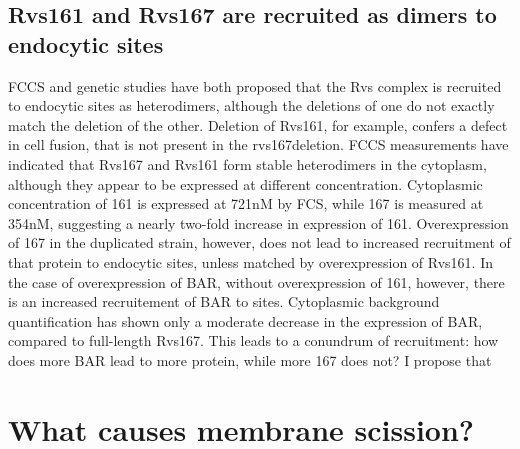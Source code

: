 \subsection{Rvs161 and Rvs167 are recruited as dimers to endocytic sites}
FCCS and genetic studies have both proposed that the Rvs complex is recruited to endocytic sites as heterodimers, although the deletions of one do not exactly match the deletion of the other. Deletion of Rvs161, for example, confers a defect in cell fusion, that is not present in the rvs167deletion. FCCS measurements have indicated that Rvs167 and Rvs161 form stable heterodimers in the cytoplasm, although they appear to be expressed at different concentration. Cytoplasmic concentration of 161 is expressed at 721nM by FCS, while 167 is measured at 354nM, suggesting a nearly two-fold increase in expression of 161. Overexpression of 167 in the duplicated strain, however, does not lead to increased recruitment of that protein to endocytic sites, unless matched by overexpression of Rvs161. In the case of overexpression of BAR, without overexpression of 161, however, there is an increased recruitement of BAR to sites. Cytoplasmic background quantification has shown only a moderate decrease in the expression of BAR, compared to full-length Rvs167. This leads to a conundrum of recruitment: how does more BAR lead to more protein, while more 167 does not? I propose that 


\section{What causes membrane scission?}


